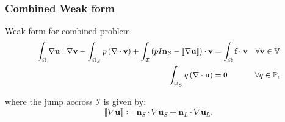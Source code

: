 \documentclass{beamer}
\theoremstyle{definition}
\begin{document}
\begin{frame}
\frametitle{Combined Weak form}
	\begin{block}{Weak form for combined problem}\vspace{-4mm}
	\begin{equation}\label{weak_total}{\small
	\begin{aligned}
	\int_{\Omega}\nabla \textbf{u} : \nabla \textbf{v}-\int_{\Omega_S}p\left(\nabla \cdot \textbf{v}\right) +\int_{\mathcal{I}}\left( pI \textbf{n}_S-\llbracket\nabla\textbf{u}\rrbracket\right)\cdot\textbf{v} &=\int_{\Omega}\textbf{f}\cdot \textbf{v} \quad \forall  \textbf{v}\in \mathbb{V}\\
	\int_{\Omega_S}q\left(\nabla \cdot \textbf{u}\right) &= 0\quad\quad\,\,\,\quad \forall q\in \mathbb{P},
	\end{aligned}}
	\end{equation}
	\end{block}
where the jump accross $\mathcal{I}$ is given by:\vspace{-2mm}
\begin{equation}
\llbracket\nabla \textbf{u} \rrbracket \coloneqq \textbf{n}_S\cdot\nabla \textbf{u}_S+\textbf{n}_L\cdot  \nabla\textbf{u}_L.
\end{equation}
\end{frame}
 
\end{document}
